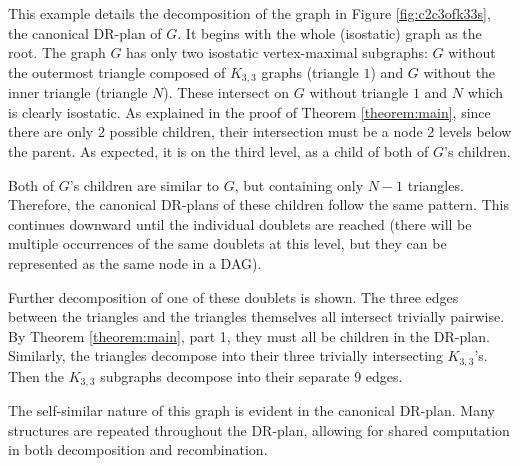 \begin{example}
This example details the decomposition of the graph in Figure \ref{fig:c2c3ofk33s}, the canonical DR-plan of $G$. It begins with the whole (isostatic) graph as the root. The graph $G$ has only two isostatic vertex-maximal subgraphs: $G$ without the outermost triangle composed of $K_{3,3}$ graphs (triangle $1$) and $G$ without the inner triangle (triangle $N$). These intersect on $G$ without triangle $1$ and $N$ which is clearly isostatic. As explained in the proof of Theorem \ref{theorem:main}, since there are only 2 possible children, their intersection must be a node 2 levels below the parent. As expected, it is on the third level, as a child of both of $G$'s children.

Both of $G$'s children are similar to $G$, but containing only $N-1$ triangles. Therefore, the canonical DR-plans of these children follow the same pattern. This continues downward until the individual doublets are reached (there will be multiple occurrences of the same doublets at this level, but they can be represented as the same node in a DAG).

Further decomposition of one of these doublets is shown. The three edges between the triangles and the triangles themselves all intersect trivially pairwise. By Theorem \ref{theorem:main}, part 1, they must all be children in the DR-plan. Similarly, the triangles decompose into their three trivially intersecting $K_{3,3}$'s. Then the $K_{3,3}$ subgraphs decompose into their separate 9 edges.

The self-similar nature of this graph is evident in the canonical DR-plan. Many structures are repeated throughout the DR-plan, allowing for shared computation in both decomposition and recombination.
\end{example}





